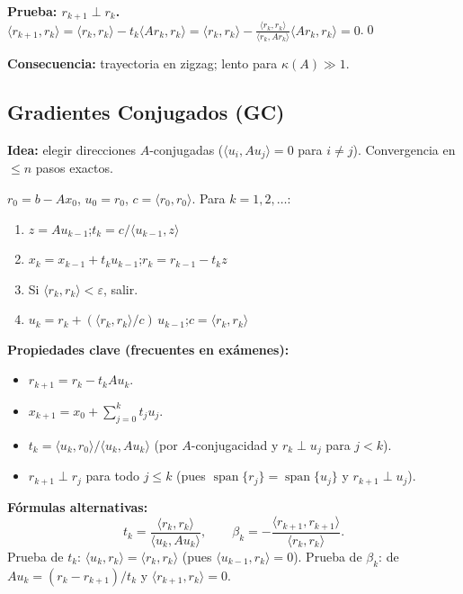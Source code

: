 \documentclass[12pt,a4paper]{article}
\begin{document}
\begin{resultado}
\textbf{Prueba: $r_{k+1}\perp r_k$.}
$\langle r_{k+1},r_k\rangle=\langle r_k,r_k\rangle-t_k\langle Ar_k,r_k\rangle
=\langle r_k,r_k\rangle-\tfrac{\langle r_k,r_k\rangle}{\langle r_k,Ar_k\rangle}\langle Ar_k,r_k\rangle=0$.\quad\qed

\textbf{Consecuencia:} trayectoria en zigzag; lento para $\kappa(A)\gg1$.
\end{resultado}

\subsection{Gradientes Conjugados (GC)}

\textbf{Idea:} elegir direcciones $A$-conjugadas ($\langle u_i,Au_j\rangle=0$ para $i\ne j$). Convergencia en $\le n$ pasos exactos.

\begin{algoritmo}[title={Gradientes Conjugados}]
$r_0=b-Ax_0$, $u_0=r_0$, $c=\langle r_0,r_0\rangle$. Para $k=1,2,\ldots$:
\begin{enumerate}[noitemsep]
  \item $z=Au_{k-1}$;\quad $t_k=c/\langle u_{k-1},z\rangle$
  \item $x_k=x_{k-1}+t_ku_{k-1}$;\quad $r_k=r_{k-1}-t_kz$
  \item Si $\langle r_k,r_k\rangle<\varepsilon$, salir.
  \item $u_k=r_k+({\langle r_k,r_k\rangle}/{c})\,u_{k-1}$;\quad $c=\langle r_k,r_k\rangle$
\end{enumerate}
\end{algoritmo}

\begin{resultado}
\textbf{Propiedades clave (frecuentes en exámenes):}
\begin{itemize}[noitemsep]
  \item $r_{k+1}=r_k-t_kAu_k$.
  \item $x_{k+1}=x_0+\sum_{j=0}^kt_ju_j$.
  \item $t_k=\langle u_k,r_0\rangle/\langle u_k,Au_k\rangle$ (por $A$-conjugacidad y $r_k\perp u_j$ para $j<k$).
  \item $r_{k+1}\perp r_j$ para todo $j\le k$ (pues $\operatorname{span}\{r_j\}=\operatorname{span}\{u_j\}$ y $r_{k+1}\perp u_j$).
\end{itemize}

\textbf{Fórmulas alternativas:}
\[
  t_k=\frac{\langle r_k,r_k\rangle}{\langle u_k,Au_k\rangle},\qquad
  \beta_k=-\frac{\langle r_{k+1},r_{k+1}\rangle}{\langle r_k,r_k\rangle}.
\]
Prueba de $t_k$: $\langle u_k,r_k\rangle=\langle r_k,r_k\rangle$ (pues $\langle u_{k-1},r_k\rangle=0$).
Prueba de $\beta_k$: de $Au_k=(r_k-r_{k+1})/t_k$ y $\langle r_{k+1},r_k\rangle=0$.
\end{resultado}
\end{document}
